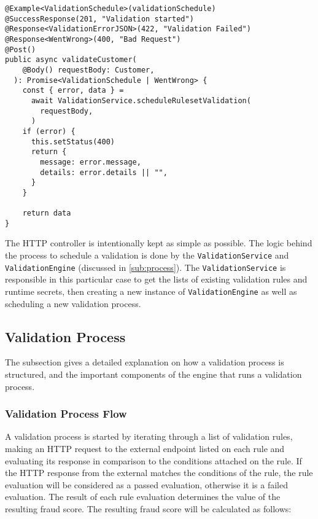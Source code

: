     \begin{lstlisting}[style=es6, caption={HTTP controller to schedule a validation process (TypeScript)}]
@Example<ValidationSchedule>(validationSchedule)
@SuccessResponse(201, "Validation started")
@Response<ValidationErrorJSON>(422, "Validation Failed")
@Response<WentWrong>(400, "Bad Request")
@Post()
public async validateCustomer(
    @Body() requestBody: Customer,
  ): Promise<ValidationSchedule | WentWrong> {
    const { error, data } =
      await ValidationService.scheduleRulesetValidation(
        requestBody,
      )
    if (error) {
      this.setStatus(400)
      return {
        message: error.message,
        details: error.details || "",
      }
    }

    return data
}
    \end{lstlisting}

    The HTTP controller is intentionally kept as simple as possible. The logic behind the process to schedule a validation is done by the \verb;ValidationService; and \verb;ValidationEngine; (discussed in \autoref{sub:process}). The \verb;ValidationService; is responsible in this particular case to get the lists of existing validation rules and runtime secrets, then creating a new instance of \verb;ValidationEngine; as well as scheduling a new validation process. 

  \subsection{Validation Process}
    \label{sub:process}
    
    The subsection gives a detailed explanation on how a validation process is structured, and the important components of the engine that runs a validation process. 

    \subsubsection{Validation Process Flow}
      \label{impl_cl:flow}
    
      A validation process is started by iterating through a list of validation rules, making an HTTP request to the external endpoint listed on each rule and evaluating its response in comparison to the conditions attached on the rule. If the HTTP response from the external matches the conditions of the rule, the rule evaluation will be considered as a passed evaluation, otherwise it is a failed evaluation. The result of each rule evaluation determines the value of the resulting fraud score. The resulting fraud score will be calculated as follows: 


